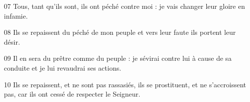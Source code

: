 
07 Tous, tant qu’ils sont, ils ont péché contre moi : je vais changer leur gloire en infamie.

08 Ils se repaissent du péché de mon peuple et vers leur faute ils portent leur désir.

09 Il en sera du prêtre comme du peuple : je sévirai contre lui à cause de sa conduite et je lui revaudrai ses actions.

10 Ils se repaissent, et ne sont pas rassasiés, ils se prostituent, et ne s’accroissent pas, car ils ont cessé de respecter le Seigneur.